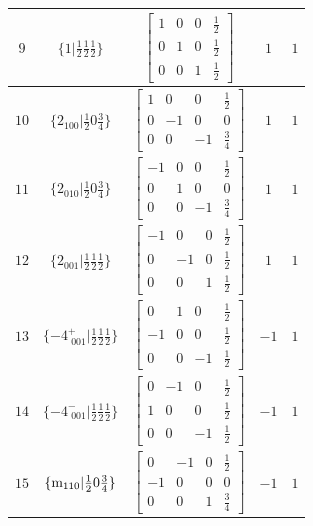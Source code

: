 \documentclass[fleqn,8pt]{jsarticle}
\begin{document}
\begin{longtable}{ccccc}
$ 9 $ & $ \{1|\frac{1}{2} \frac{1}{2} \frac{1}{2}\} $ & $ \begin{bmatrix} 1 & 0 & 0 & \frac{1}{2} \\ 0 & 1 & 0 & \frac{1}{2} \\ 0 & 0 & 1 & \frac{1}{2} \end{bmatrix} $ & $ 1 $ & $ 1 $ \\ \hline
$ 10 $ & $ \{2{}_{100}|\frac{1}{2} 0 \frac{3}{4}\} $ & $ \begin{bmatrix} 1 & 0 & 0 & \frac{1}{2} \\ 0 & -1 & 0 & 0 \\ 0 & 0 & -1 & \frac{3}{4} \end{bmatrix} $ & $ 1 $ & $ 1 $ \\ \hline
$ 11 $ & $ \{2{}_{010}|\frac{1}{2} 0 \frac{3}{4}\} $ & $ \begin{bmatrix} -1 & 0 & 0 & \frac{1}{2} \\ 0 & 1 & 0 & 0 \\ 0 & 0 & -1 & \frac{3}{4} \end{bmatrix} $ & $ 1 $ & $ 1 $ \\ \hline
$ 12 $ & $ \{2{}_{001}|\frac{1}{2} \frac{1}{2} \frac{1}{2}\} $ & $ \begin{bmatrix} -1 & 0 & 0 & \frac{1}{2} \\ 0 & -1 & 0 & \frac{1}{2} \\ 0 & 0 & 1 & \frac{1}{2} \end{bmatrix} $ & $ 1 $ & $ 1 $ \\ \hline
$ 13 $ & $ \{-4^{+}_{\,\,001}|\frac{1}{2} \frac{1}{2} \frac{1}{2}\} $ & $ \begin{bmatrix} 0 & 1 & 0 & \frac{1}{2} \\ -1 & 0 & 0 & \frac{1}{2} \\ 0 & 0 & -1 & \frac{1}{2} \end{bmatrix} $ & $ -1 $ & $ 1 $ \\ \hline
$ 14 $ & $ \{-4^{-}_{\,\,001}|\frac{1}{2} \frac{1}{2} \frac{1}{2}\} $ & $ \begin{bmatrix} 0 & -1 & 0 & \frac{1}{2} \\ 1 & 0 & 0 & \frac{1}{2} \\ 0 & 0 & -1 & \frac{1}{2} \end{bmatrix} $ & $ -1 $ & $ 1 $ \\ \hline
$ 15 $ & $ \{{\rm m}_{110}|\frac{1}{2} 0 \frac{3}{4}\} $ & $ \begin{bmatrix} 0 & -1 & 0 & \frac{1}{2} \\ -1 & 0 & 0 & 0 \\ 0 & 0 & 1 & \frac{3}{4} \end{bmatrix} $ & $ -1 $ & $ 1 $ \\ \hline

\end{longtable}
\end{document}
